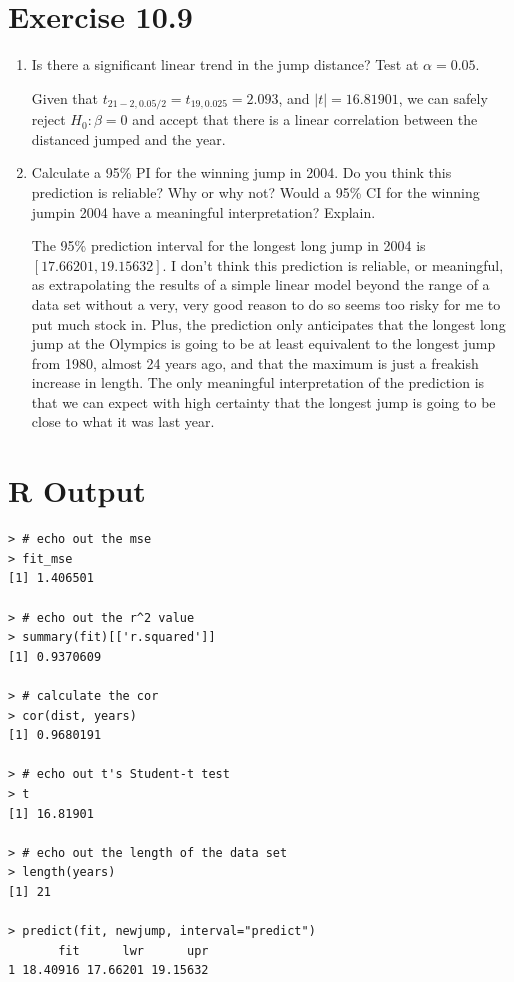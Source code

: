 \documentclass{article}
\begin{document}
\section*{Exercise 10.9}

\begin{enumerate}[\quad(a)]
	\item Is there a significant linear trend in the jump distance? Test at $\alpha = 0.05$.

	Given that $t_{21-2, 0.05/2} = t_{19, 0.025} = 2.093$, and $|t| = 16.81901$, we can safely reject $H_0: \beta = 0$ and accept that there is a linear correlation between the distanced jumped and the year.

	\item Calculate a 95\% PI for the winning jump in 2004. Do you think this prediction is reliable? Why or why not? Would a 95\% CI for the winning jumpin 2004 have a meaningful interpretation? Explain.

	The 95\% prediction interval for the longest long jump in 2004 is $[ 17.66201, 19.15632 ]$. I don't think this prediction is reliable, or meaningful, as extrapolating the results of a simple linear model beyond the range of a data set without a very, very good reason to do so seems too risky for me to put much stock in. Plus, the prediction only anticipates that the longest long jump at the Olympics is going to be at least equivalent to the longest jump from 1980, almost 24 years ago, and that the maximum is just a freakish increase in length. The only meaningful interpretation of the prediction is that we can expect with high certainty that the longest jump is going to be close to what it was last year.
\end{enumerate}

\section*{R Output}
\begin{verbatim}
> # echo out the mse
> fit_mse
[1] 1.406501

> # echo out the r^2 value
> summary(fit)[['r.squared']]
[1] 0.9370609

> # calculate the cor
> cor(dist, years)
[1] 0.9680191

> # echo out t's Student-t test
> t
[1] 16.81901

> # echo out the length of the data set
> length(years)
[1] 21

> predict(fit, newjump, interval="predict")
       fit      lwr      upr
1 18.40916 17.66201 19.15632
\end{verbatim}
\end{document}
